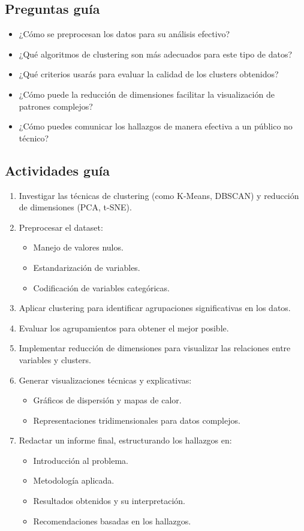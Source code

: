 \documentclass[a4,11pt]{aleph-notas}
\begin{document}
\subsection*{Preguntas guía}
\begin{itemize}[leftmargin=*]
\item ¿Cómo se preprocesan los datos para su análisis efectivo?
\item ¿Qué algoritmos de clustering son más adecuados para este tipo de datos?
\item ¿Qué criterios usarás para evaluar la calidad de los clusters obtenidos?
\item ¿Cómo puede la reducción de dimensiones facilitar la visualización de patrones complejos?
\item ¿Cómo puedes comunicar los hallazgos de manera efectiva a un público no técnico?
\end{itemize}

\subsection*{Actividades guía}
\begin{enumerate}[leftmargin=*, label={{\arabic*.}}]
\item Investigar las técnicas de clustering (como K-Means, DBSCAN) y reducción de dimensiones (PCA, t-SNE).
\item Preprocesar el dataset:
    \begin{itemize}[leftmargin=*]
    \item Manejo de valores nulos.
    \item Estandarización de variables.
    \item Codificación de variables categóricas.
    \end{itemize}
\item Aplicar clustering para identificar agrupaciones significativas en los datos.
\item Evaluar los agrupamientos para obtener el mejor posible.
\item Implementar reducción de dimensiones para visualizar las relaciones entre variables y clusters.
\item Generar visualizaciones técnicas y explicativas:
    \begin{itemize}[leftmargin=*]
    \item Gráficos de dispersión y mapas de calor.
    \item Representaciones tridimensionales para datos complejos.
    \end{itemize}
\item Redactar un informe final, estructurando los hallazgos en:
    \begin{itemize}[leftmargin=*]
    \item Introducción al problema.
    \item Metodología aplicada.
    \item Resultados obtenidos y su interpretación.
    \item Recomendaciones basadas en los hallazgos.
    \end{itemize}
\end{enumerate}
\end{document}
